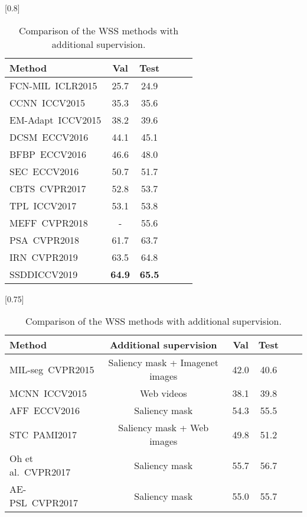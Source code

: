 \documentclass[10pt,twocolumn,letterpaper]{article}
\begin{document}
\begin{table}[tb]
 \begin{center}
  \caption{Comparison with the WSS methods without additional supervision. \label{cmp_img_level}}
\scalebox{0.8}[0.8]{
  \begin{tabular}{l|c|cccc}
    Method  & Val & Test\\
      \hline
       FCN-MIL~\cite{Pathak215}\tiny{ICLR2015}    &  25.7 & 24.9 \\
       CCNN~\cite{Pathak15}\tiny{ICCV2015}    &  35.3 &35.6 \\
       EM-Adapt~\cite{papa15}\tiny{ICCV2015}      &  38.2 &39.6 \\
       DCSM~\cite{dcsm}\tiny{ECCV2016}     &  44.1 &45.1 \\
       BFBP~\cite{bfb}\tiny{ECCV2016}   &  46.6   &  48.0 \\
       SEC~\cite{sec}\tiny{ECCV2016}    &  50.7 &51.7 \\
       CBTS~\cite{cbts}\tiny{CVPR2017}    &  52.8 &53.7 \\
       TPL~\cite{tphase}\tiny{ICCV2017}   &  53.1 &53.8 \\
       MEFF~\cite{meff}\tiny{CVPR2018}   &  - &55.6 \\
       PSA~\cite{psa}\tiny{CVPR2018}      &  61.7 &63.7 \\
       IRN~\cite{irn}\tiny{CVPR2019} & 63.5 & 64.8 \\ \hline
       SSDD\tiny{ICCV2019}  & \bf 64.9 & \bf 65.5 \\
  \end{tabular}}
\smallskip
\caption{Comparison of the WSS methods with additional supervision. \label{cmp_add_info}}
\scalebox{0.75}[0.75]{
  \begin{tabular}{l|c|c|ccc}
    Method & Additional supervision & Val & Test\\
      \hline
       MIL-seg~\cite{ped15}\tiny{CVPR2015}  & Saliency mask + Imagenet images & 42.0  & 40.6\\
       MCNN~\cite{mcue}\tiny{ICCV2015}     & Web videos  &38.1   &  39.8 \\
       AFF~\cite{afss}\tiny{ECCV2016}    & Saliency mask & 54.3   &  55.5 \\
       STC~\cite{stc}\tiny{PAMI2017}    & Saliency mask + Web images & 49.8   &  51.2 \\
       Oh et al.~\cite{joon17cvpr}\tiny{CVPR2017}   & Saliency mask &  55.7   &  56.7 \\
       AE-PSL~\cite{erasing}\tiny{CVPR2017}    & Saliency mask & 55.0   &  55.7 \\

\end{tabular}}
\end{center}
\end{table}
\end{document}
